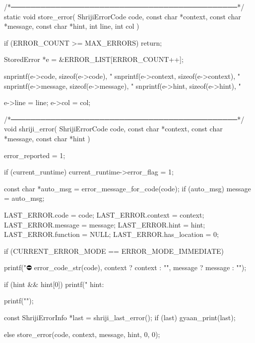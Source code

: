\documentclass{article}
\begin{document}
/*──────────────────────────────────────────────*/
static void store_error(
    ShrijiErrorCode code,
    const char *context,
    const char *message,
    const char *hint,
    int line,
    int col
)
{
    if (ERROR_COUNT >= MAX_ERRORS) return;

    StoredError *e = &ERROR_LIST[ERROR_COUNT++];

    snprintf(e->code, sizeof(e->code), "%
    snprintf(e->context, sizeof(e->context), "%
    snprintf(e->message, sizeof(e->message), "%
    snprintf(e->hint, sizeof(e->hint), "%

    e->line = line;
    e->col = col;
}


/*──────────────────────────────────────────────*/
void shriji_error(
    ShrijiErrorCode code,
    const char *context,
    const char *message,
    const char *hint
)
{
    error_reported = 1;

    if (current_runtime) {
        current_runtime->error_flag = 1;
    }

    const char *auto_msg = error_message_for_code(code);
    if (auto_msg)
        message = auto_msg;

    LAST_ERROR.code = code;
    LAST_ERROR.context = context;
    LAST_ERROR.message = message;
    LAST_ERROR.hint = hint;
    LAST_ERROR.function = NULL;
    LAST_ERROR.has_location = 0;

    if (CURRENT_ERROR_MODE == ERROR_MODE_IMMEDIATE) {

        printf("\n⛔ %
               error_code_str(code),
               context ? context : "",
               message ? message : "");

        if (hint && hint[0])
            printf("   hint: %

        printf("\n");

        const ShrijiErrorInfo *last = shriji_last_error();
        if (last) {
            gyaan_print(last);
        }

    } else {
        store_error(code, context, message, hint, 0, 0);
    }
}
\end{document}
